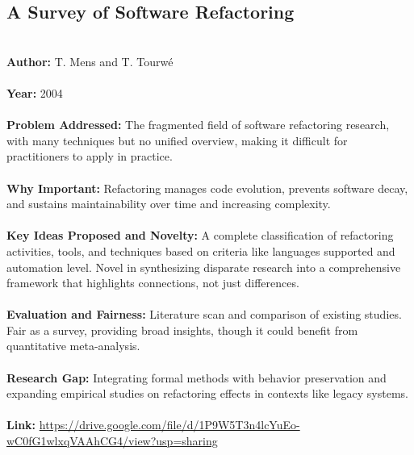 \documentclass[12pt]{article}
\begin{document}
\subsection*{A Survey of Software Refactoring}
\\
\textbf{Author:} T. Mens and T. Tourwé \\
\\
\textbf{Year:} 2004 \\
\\
\textbf{Problem Addressed:} The fragmented field of software refactoring research, with many techniques but no unified overview, making it difficult for practitioners to apply in practice. \\
\\
\textbf{Why Important:} Refactoring manages code evolution, prevents software decay, and sustains maintainability over time and increasing complexity. \\
\\
\textbf{Key Ideas Proposed and Novelty:} A complete classification of refactoring activities, tools, and techniques based on criteria like languages supported and automation level. Novel in synthesizing disparate research into a comprehensive framework that highlights connections, not just differences. \\
\\
\textbf{Evaluation and Fairness:} Literature scan and comparison of existing studies. Fair as a survey, providing broad insights, though it could benefit from quantitative meta-analysis. \\
\\
\textbf{Research Gap:} Integrating formal methods with behavior preservation and expanding empirical studies on refactoring effects in contexts like legacy systems. \\
\\
\textbf{Link:} \url{https://drive.google.com/file/d/1P9W5T3n4lcYuEo-wC0fG1wlxqVAAhCG4/view?usp=sharing}
\pagebreak

\end{document}
